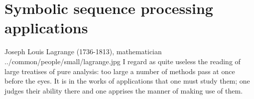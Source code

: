   
  \section{Symbolic sequence processing applications}
\qboxnpq
  {
    Joseph Louis Lagrange (1736-1813), mathematician
    \footnotemark
  }
  {../common/people/small/lagrange.jpg}
  {I regard as quite useless the reading of large treatises of pure analysis:
    too large a number of methods pass at once before the eyes.
    It is in the works of applications that one must study them;
    one judges their ability there and one apprises the manner of making use of them.}

  
  
  
  

